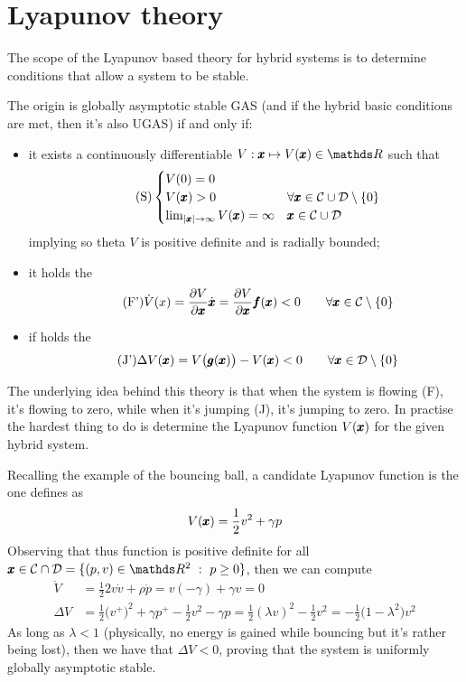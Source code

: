 \section{Lyapunov theory}
	The scope of the Lyapunov based theory for hybrid systems is to determine conditions that allow a system to be stable.
	
	\begin{theorem}
		The origin is globally asymptotic stable GAS (and if the hybrid basic conditions are met, then it's also UGAS) if and only if:
		\begin{itemize}
			\item it exists a continuously differentiable  $V:\x \mapsto V(\x) \in \mathds R$ such that 
			\[ \tag{S} \begin{cases}
				V(0) = 0 \\ V(\pmb{x}) > 0 \quad & \forall \pmb{x} \in \mathcal C \cup \mathcal D \setminus \{0\} \\
				\lim_{|\pmb{x}|\rightarrow\infty} V(\pmb{x}) = \infty & \pmb{x} \in \mathcal C \cup \mathcal D
			\end{cases} \]
			implying so theta $V$ is positive definite and is radially bounded;
			\item it holds the 
			\[\tag{F'} \dot V(x) = \frac{\partial V}{\partial \pmb{x}} \dot{\pmb{x}} = \frac{\partial V}{\partial \pmb{x}} \pmb{f}(\pmb{x}) < 0 \qquad \forall \pmb{x} \in \mathcal C\setminus\{0\} \]
			\item if holds the 
			\[ \tag{J'} \Delta V(\pmb{x}) = V\big(\pmb{g}(\pmb{x})\big) - V(\pmb{x}) < 0 \qquad \forall \pmb{x} \in \mathcal D \setminus\{0\} \]
		\end{itemize}
	\end{theorem}
	The underlying idea behind this theory is that when the system is flowing (F), it's flowing to zero, while when it's jumping (J), it's jumping to zero. In practise the hardest thing to do is determine the Lyapunov function $V(\pmb{x})$ for the given hybrid system.
	
	Recalling the example of the bouncing ball, a candidate Lyapunov function is the one defines as
	\[ V(\pmb{x}) = \frac 1 2 v^2 + \gamma p \]
	Observing that thus function is positive definite for all $\x \in \fset \cap \jset = \{ (p,v) \in \mathds R^2 \ : \ p\geq 0\}$, then we can compute
	\begin{align*}
		\dot V & = \frac 1 2 2 v\dot v + \rho \dot p = v(-\gamma) + \gamma v = 0 \\
		\Delta V & =\frac 1 2\big(v^+\big)^2 + \gamma p^+ - \frac 1 2 v^2 - \gamma p = \frac 1 2 (\lambda v)^2 - \frac 1 2 v^2 = - \frac 12 \big(1-\lambda^2\big) v^2
	\end{align*}
	As long as $\lambda < 1$ (physically, no energy is gained while bouncing but it's rather being lost), then we have that $\Delta V < 0$, proving that the system is uniformly globally asymptotic stable.
	
	
	
	
	
	
	
	
	
	
	
	
	
	
	
	
	
	
	
	
	
	
	
	
	